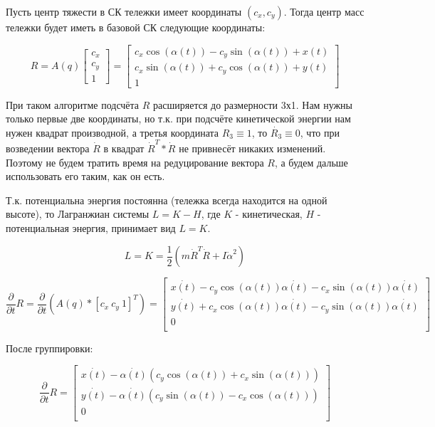 \documentclass[fleqn, a4paper, 12pt, russian]{article}
\begin{document}
	Пусть центр тяжести в СК тележки имеет координаты $(c_x,c_y)$.	Тогда центр масс тележки будет иметь в базовой СК следующие координаты:
	
	\begin{equation}
		R = A(q)\begin{bmatrix}
			c_x\\c_y\\1
		\end{bmatrix}=\begin{bmatrix}
			c_x\cos(\alpha(t))-	c_y\sin(\alpha(t)) +x(t)\\
			c_x\sin(\alpha(t))+	c_y\cos(\alpha(t)) +y(t)\\
			1
		\end{bmatrix}
	\end{equation}
	
	При таком алгоритме подсчёта $R$ расширяется до размерности 3х1. Нам нужны только первые две координаты, но т.к. при подсчёте кинетической энергии нам нужен квадрат производной, а третья координата $R_3\equiv 1$, то $\dot{R_3}\equiv 0$, что при возведении вектора $\dot{R}$ в квадрат $\dot{R}^T*\dot{R}$ не привнесёт никаких изменений. Поэтому не будем тратить время на редуцирование вектора $R$, а будем дальше использовать его таким, как он есть.
	
	
	Т.к. потенциальна энергия постоянна (тележка всегда находится на одной высоте), то Лагранжиан системы $L = K - H$, где $K$ - кинетическая, $H$ -  потенциальная энергия, принимает вид $L=K$.
	
	\begin{equation}
		L = K = \frac{1}{2}(m\dot{R}^T\dot{R}+I\dot{\alpha}^2)
	\end{equation} 
	
	
	\begin{equation}
		 \frac{\partial }{\partial t}R = \frac{\partial }{\partial t} (A(q)*[c_x~c_y~1]^T)=
		\begin{bmatrix}
			\dot{x(t)} - c_y\cos(\alpha(t))\dot{\alpha(t)} - c_x\sin(\alpha(t))\dot{\alpha(t)}\\
			\dot{y(t)} + c_x\cos(\alpha(t))\dot{\alpha(t)} - c_y\sin(\alpha(t))\dot{\alpha(t)}\\
			0\\
		\end{bmatrix}
	\end{equation}
	
	После группировки:
	
	\begin{equation}
	 \frac{\partial }{\partial t}R =
	\begin{bmatrix}
	\dot{x(t)} - \dot{\alpha(t)}(c_y\cos(\alpha(t))+ c_x\sin(\alpha(t)))\\
	\dot{y(t)} - \dot{\alpha(t)}(c_y\sin(\alpha(t))- c_x\cos(\alpha(t)))\\
	0\\
	\end{bmatrix}
	\end{equation}
\end{document}
